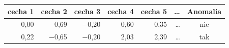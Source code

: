 \begin{tabular}{rrrrrrc}
\toprule
cecha 1 & cecha 2 & cecha 3 & cecha 4 & cecha 5 & \dots & Anomalia \\
\midrule
0,00 & 0,69 & $-$0,20 & 0,60 & 0,35 & \dots & nie \\
0,22 & $-$0,65 & $-$0,20 & 2,03 & 2,39 & \dots & tak \\
\bottomrule
\end{tabular}
